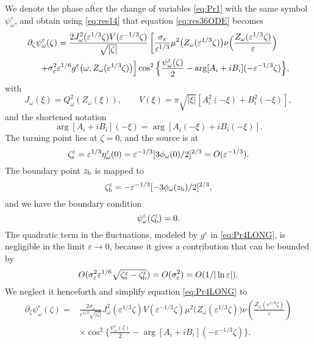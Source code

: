 \documentclass[final]{siamltex}
\begin{document}
We denote the phase after the change of variables \eqref{eq:Pr1} with the same symbol $\psi_{\omega}^{\varepsilon}$, 
and obtain using  \eqref{eq:res14} that equation
\eqref{eq:res36ODE} becomes
\begin{align}
\partial_\zeta \psi_{\omega}^{\varepsilon}(\zeta) &=\frac{2J_{\omega}^2({\varepsilon}^{1/3} \zeta) V({\varepsilon}^{-1/3} \zeta)}{
  \sqrt{|\zeta|}} 
\left[ \frac{\sigma_{\varepsilon}}{{\varepsilon}^{1/3}} \mu^2 \big(Z_{\omega}({\varepsilon}^{1/3} \zeta)\big) \nu \Big(
\frac{Z_{\omega}({\varepsilon}^{1/3} \zeta)}{\varepsilon} \Big)  \right. \nonumber \\
&\hspace{-0.3in}\left. +\sigma_{\varepsilon}^2 {\varepsilon}^{1/6} g^{\varepsilon} \big({\omega}, Z_{\omega}({\varepsilon}^{1/3} \zeta)  \big) \right]  \cos^2
\Big\{ \frac{\psi_{\omega}^{\varepsilon}(\zeta)}{2} - \arg[A_i + i B_i](-{\varepsilon}^{-1/3} \zeta)\Big\},
\label{eq:Pr4LONG}
\end{align}
with 
\begin{equation}
J_{\omega}(\xi) = Q_{\omega}^2(Z_{\omega}(\xi)), \qquad V(\xi) = \pi \sqrt{|\xi|} \left[
  A_i^2(-\xi) + B_i^2(-\xi)\right],
\label{eq:Pr5}
\end{equation}
and the shortened notation 
\[
\arg[A_i+i B_i](-\xi) = \arg[A_i(-\xi) + i B_i(-\xi)].
\]
The turning point lies at $\zeta = 0$, and the source is at
\begin{equation}
\label{eq:zeta0}
\zeta_{\rm s}^{\varepsilon} = {\varepsilon}^{1/3} \eta_{\omega}^{\varepsilon}(0) = {\varepsilon}^{-1/3} [3
  \phi_{\omega}(0)/2]^{2/3} = O({\varepsilon}^{-1/3}).
\end{equation}
The boundary point $z_{\rm b}$ is mapped to
\begin{equation}
\label{eq:zeta_b}
\zeta_{\rm b}^{\varepsilon} = -{\varepsilon}^{-1/3} [-3 \phi_{\omega}(z_{\rm b})/2]^{2/3},
\end{equation}
and we have the boundary condition 
\begin{equation}
\psi_{\omega}^{\varepsilon}(\zeta_{\rm b}^{\varepsilon}) = 0.
\label{eq:Pr6}
\end{equation}
The quadratic term in the fluctuations, modeled by $g^{\varepsilon}$ in \eqref{eq:Pr4LONG}, is 
negligible in the limit ${\varepsilon} \to 0$, 
because it gives a contribution that can be bounded by 
\[O( \sigma_{\varepsilon}^2 {\varepsilon}^{1/6}\sqrt{\zeta^{\varepsilon}_{\rm s}-\zeta^{\varepsilon}_{\rm b}} )=
O(\sigma_{\varepsilon}^2) = O(1/|\ln {\varepsilon}|).
\]
We neglect it henceforth and simplify equation \eqref{eq:Pr4LONG} to 
\begin{align}
\partial_\zeta \psi_{\omega}^{\varepsilon}(\zeta) =& \frac{2 \sigma_{\varepsilon}}{{\varepsilon}^{1/3}
  \sqrt{|\zeta|}} J_{\omega}^2({\varepsilon}^{1/3} \zeta) V({\varepsilon}^{-1/3} \zeta)
\mu^2 \big(Z_{\omega}({\varepsilon}^{1/3} \zeta)\big) \nu \left(
\frac{Z_{\omega}({\varepsilon}^{1/3} \zeta)}{\varepsilon} \right) \nonumber \\ &\times \cos^2
\Big\{ \frac{\psi_{\omega}^{\varepsilon}(\zeta)}{2} - \arg[A_i+ i B_i](-{\varepsilon}^{-1/3} \zeta)\Big\}. 
\label{eq:Pr4}
\end{align}
\end{document}
